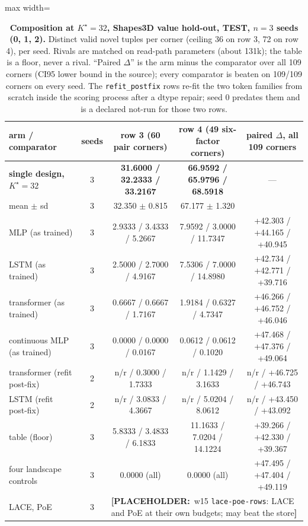 \documentclass{article}
\newcommand{\PLACEHOLDER}[1]{{\color{red}\textbf{[PLACEHOLDER:}~#1\textbf{]}}}
\newcommand{\Kstar}{\ensuremath{K^{\star}}}
\begin{document}
\begin{table}[t]
\centering\small
\caption{\textbf{Composition at $\Kstar=32$, Shapes3D value hold-out, TEST, $n=3$ seeds
(0, 1, 2).} Distinct valid novel tuples per corner (ceiling 36 on row 3, 72 on row 4), per
seed. Rivals are matched on read-path parameters (about 131k); the table is a floor, never a
rival. ``Paired $\Delta$'' is the arm minus the comparator over all 109 corners (CI95 lower
bound in the source); every comparator is beaten on 109/109 corners on every seed. The
\texttt{refit\_postfix} rows re-fit the two token families from scratch inside the scoring
process after a dtype repair; seed 0 predates them and is a declared not-run for those two
rows.}
\label{tab:t7}
\setlength{\tabcolsep}{3.2pt}
\begin{adjustbox}{max width=\linewidth}\begin{tabular}{lcccc}
\toprule
arm / comparator & seeds & row 3 (60 pair corners) & row 4 (49 six-factor corners) & paired $\Delta$, all 109 corners \\
\midrule
\textbf{single design, $\Kstar=32$} & 3 & \textbf{31.6000 / 32.2333 / 33.2167} & \textbf{66.9592 / 65.9796 / 68.5918} & --- \\
\quad mean $\pm$ sd & 3 & 32.350 $\pm$ 0.815 & 67.177 $\pm$ 1.320 & \\
MLP (as trained) & 3 & 2.9333 / 3.4333 / 5.2667 & 7.9592 / 3.0000 / 11.7347 & +42.303 / +44.165 / +40.945 \\
LSTM (as trained) & 3 & 2.5000 / 2.7000 / 4.9167 & 7.5306 / 7.0000 / 14.8980 & +42.734 / +42.771 / +39.716 \\
transformer (as trained) & 3 & 0.6667 / 0.6667 / 1.7167 & 1.9184 / 0.6327 / 4.7347 & +46.266 / +46.752 / +46.046 \\
continuous MLP (as trained) & 3 & 0.0000 / 0.0000 / 0.0167 & 0.0612 / 0.0612 / 0.1020 & +47.468 / +47.376 / +49.064 \\
transformer (refit post-fix) & 2 & n/r / 0.3000 / 1.7333 & n/r / 1.1429 / 3.1633 & n/r / +46.725 / +46.743 \\
LSTM (refit post-fix) & 2 & n/r / 3.0833 / 4.3667 & n/r / 5.0204 / 8.0612 & n/r / +43.450 / +43.092 \\
table (floor) & 3 & 5.8333 / 3.4833 / 6.1833 & 11.1633 / 7.0204 / 14.1224 & +39.266 / +42.330 / +39.367 \\
\midrule
four landscape controls & 3 & 0.0000 (all) & 0.0000 (all) & +47.495 / +47.404 / +49.119 \\
LACE, PoE & 3 & \multicolumn{3}{l}{\PLACEHOLDER{w15 \texttt{lace-poe-rows}: LACE and PoE at their own budgets; may beat the store}} \\
\bottomrule
\end{tabular}\end{adjustbox}
\end{table}
\end{document}
